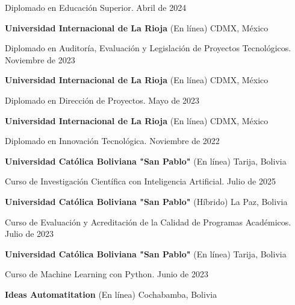 \documentclass[11pt]{article}
\begin{document}
	Diplomado en Educación Superior. \hfill Abril de 2024
	
	\vspace{12pt}
	
	\textbf{Universidad Internacional de La Rioja} \hfill (En línea) CDMX, México
	
	Diplomado en Auditoría, Evaluación y Legislación de Proyectos Tecnológicos. \hfill Noviembre de 2023
	
	\vspace{12pt}
	
	\textbf{Universidad Internacional de La Rioja} \hfill (En línea) CDMX, México
	
	Diplomado en Dirección de Proyectos. \hfill Mayo de 2023
	
	\vspace{12pt}
	
	\textbf{Universidad Internacional de La Rioja} \hfill (En línea) CDMX, México
	
	Diplomado en Innovación Tecnológica. \hfill Noviembre de 2022
	
	\vspace{12pt}
	
	\textbf{Universidad Católica Boliviana "San Pablo"} \hfill (En línea) Tarija, Bolivia
	
	Curso de Investigación Científica con Inteligencia Artificial. \hfill Julio de 2025
	
%	
%	
	
	\vspace{12pt}
	
	\textbf{Universidad Católica Boliviana "San Pablo"} \hfill (Híbrido) La Paz, Bolivia
	
	Curso de Evaluación y Acreditación de la Calidad de Programas Académicos. \hfill Julio de 2023
	
	\vspace{12pt}
	
	\textbf{Universidad Católica Boliviana "San Pablo"} \hfill (En línea) Tarija, Bolivia
	
	Curso de Machine Learning con Python. \hfill Junio de 2023
	
	\vspace{12pt}
	
	\textbf{Ideas Automatitation} \hfill (En línea) Cochabamba, Bolivia
	
\end{document}

